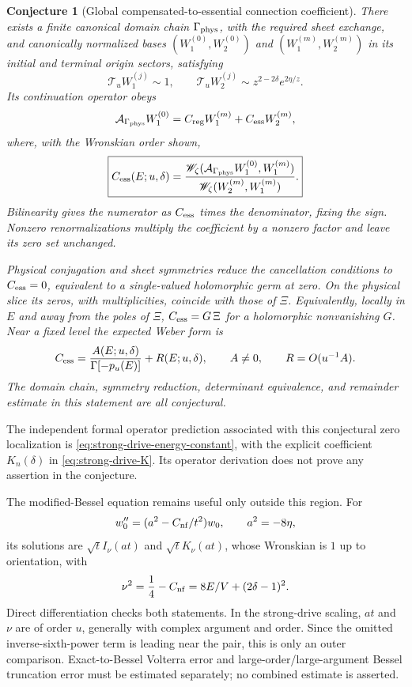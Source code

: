 \documentclass[11pt]{article}
\newtheorem{conjecture}[theorem]{Conjecture}
\theoremstyle{remark}
\begin{document}
\begin{conjecture}[Global compensated-to-essential connection coefficient]
\label{conj:essential-connection}
There exists a finite canonical domain chain \(\Gamma_{\rm phys}\), with the
required sheet exchange, and canonically normalized bases
\((W_1^{(0)},W_2^{(0)})\) and \((W_1^{(m)},W_2^{(m)})\) in its initial and
terminal origin sectors, satisfying
\[
 \mathcal T_uW_1^{(j)}\sim1,\qquad
 \mathcal T_uW_2^{(j)}\sim z^{2-2\delta}e^{2\eta/z}.
\]
Its continuation operator obeys
\[
 \mathcal A_{\Gamma_{\rm phys}}W_1^{(0)}
 =C_{\rm reg}W_1^{(m)}+C_{\rm ess}W_2^{(m)},
\]
where, with the Wronskian order shown,
\begin{equation}
 \boxed{C_{\rm ess}(E;u,\delta)=
 \frac{\mathscr W_\zeta(
 \mathcal A_{\Gamma_{\rm phys}}W_1^{(0)},W_1^{(m)})}
 {\mathscr W_\zeta(W_2^{(m)},W_1^{(m)})}.}
 \label{eq:essential-wronskian}
\end{equation}
Bilinearity gives the numerator as \(C_{\rm ess}\) times the denominator,
fixing the sign.  Nonzero renormalizations multiply the coefficient by a
nonzero factor and leave its zero set unchanged.

Physical conjugation and sheet symmetries reduce the cancellation conditions
to \(C_{\rm ess}=0\), equivalent to a single-valued holomorphic germ at zero.
On the physical slice its zeros, with multiplicities, coincide with those of
\(\Xi\).  Equivalently, locally in \(E\) and away from the poles of \(\Xi\),
\(C_{\rm ess}=G\,\Xi\) for a holomorphic nonvanishing \(G\).  Near a fixed
level the expected Weber form is
\[
 C_{\rm ess}=\frac{A(E;u,\delta)}{\Gamma[-p_u(E)]}
 +R(E;u,\delta),\qquad A\ne0,\qquad R=O(u^{-1}A).
\]
The domain chain, symmetry reduction, determinant equivalence, and remainder
estimate in this statement are all conjectural.
\end{conjecture}

The independent formal operator prediction associated with this conjectural
zero localization is \eqref{eq:strong-drive-energy-constant}, with the
explicit coefficient \(K_n(\delta)\) in \eqref{eq:strong-drive-K}.  Its
operator derivation does not prove any assertion in the conjecture.

The modified-Bessel equation remains useful only outside this region.  For
\begin{equation}
 w_0''=(a^2-C_{\rm nf}/t^2)w_0,\qquad a^2=-8\eta,
\end{equation}
its solutions are \(\sqrt t I_\nu(at)\) and \(\sqrt t K_\nu(at)\), whose
Wronskian is \(1\) up to orientation, with
\begin{equation}
 \nu^2=\frac14-C_{\rm nf}=8E/V+(2\delta-1)^2.
 \label{eq:bessel-order}
\end{equation}
Direct differentiation checks both statements.  In the strong-drive scaling,
\(at\) and \(\nu\) are of order \(u\), generally with complex argument and
order.  Since the omitted inverse-sixth-power term is leading near the pair,
this is only an outer comparison.  Exact-to-Bessel Volterra error and
large-order/large-argument Bessel truncation error must be estimated
separately; no combined estimate is asserted.
\end{document}
